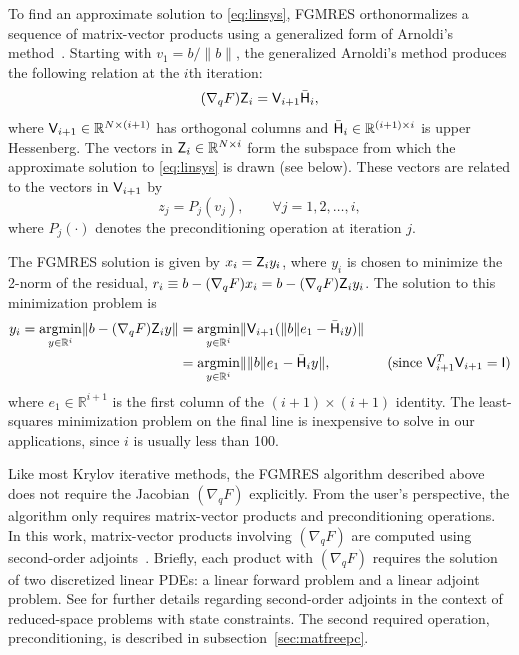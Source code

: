 To find an approximate solution to \eqref{eq:linsys}, FGMRES orthonormalizes a
sequence of matrix-vector products using a generalized form of Arnoldi's
method~\cite{saad:2003}.  Starting with $v_{1} = b/\|b\|$, the generalized
Arnoldi's method produces the following relation at the $i$th iteration:
\begin{equation}\label{eq:arnoldi}
  (\nabla_q F) \mathsf{Z}_{i} = \mathsf{V}_{i+1} \bar{\mathsf{H}}_{i},
\end{equation}
where $\mathsf{V}_{i+1} \in \mathbb{R}^{N\times (i+1)}$ has orthogonal columns and
$\bar{\mathsf{H}}_{i} \in \mathbb{R}^{(i+1)\times i}$ is upper Hessenberg.  The
vectors in $\mathsf{Z}_{i} \in \mathbb{R}^{N\times i}$ form the subspace from which
the approximate solution to \eqref{eq:linsys} is drawn (see below).  These
vectors are related to the vectors in $\mathsf{V}_{i+1}$ by
\begin{equation*}
  z_{j} = P_j(v_{j}), \qquad \forall j = 1,2,\ldots,i,
\end{equation*}
where $P_j(\cdot)$ denotes the preconditioning operation at iteration $j$.    

The FGMRES solution is given by $x_{i} = \mathsf{Z}_{i} y_{i}$, where $y_{i}$ is
chosen to minimize the 2-norm of the residual, $r_i \equiv b -  (\nabla_q F) x_i = b -  (\nabla_q F)\mathsf{Z}_i y_i$. The solution to this minimization problem is 
\begin{align*}
  y_{i} = \underset{y \in \mathbb{R}^i}{\textrm{argmin}}
  \lVert b -  (\nabla_q F) \mathsf{Z}_i y \| 
  &= \underset{y \in \mathbb{R}^i}{\textrm{argmin}}
  \lVert \mathsf{V}_{i+1} (\|b\| e_1 - \bar{\mathsf{H}}_{i} y) \| \\
  &= \underset{y \in \mathbb{R}^i}{\textrm{argmin}}
  \lVert \|b\| e_1 - \bar{\mathsf{H}}_{i} y \|,
  \qquad\qquad\text{(since $\mathsf{V}_{i+1}^T \mathsf{V}_{i+1} = \mathsf{I}$)}
\end{align*}
where $e_{1} \in \mathbb{R}^{i+1}$ is the first column of the $(i+1)\times(i+1)$
identity. The least-squares minimization problem on the final line is inexpensive to solve 
in our applications,  since $i$ is usually less than 100.

Like most Krylov iterative methods, the FGMRES algorithm described above does
not require the Jacobian $(\nabla_q F)$ explicitly.  From the user's
perspective, the algorithm only requires matrix-vector products and
preconditioning operations.  In this work, matrix-vector products involving
$(\nabla_q F)$ are computed using second-order adjoints~\cite{wang:1992,
  hicken:inexact2014}.  Briefly, each product with $(\nabla_q F)$ requires the
solution of two discretized linear PDEs: a linear forward problem and a linear
adjoint problem.  See \cite{dener:scitech2015} for further details regarding
second-order adjoints in the context of reduced-space problems with state
constraints.  The second required operation, preconditioning, is described in
subsection~\ref{sec:matfreepc}.


